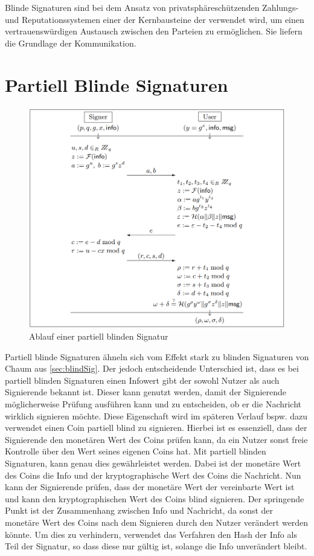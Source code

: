\documentclass[11pt,a4paper]{scrreprt}
\begin{document}
Blinde Signaturen sind bei dem Ansatz von privatsphäreschützenden Zahlungs- und Reputationssystemen einer der Kernbausteine der verwendet wird, um einen vertrauenswürdigen Austausch zwischen den Parteien zu ermöglichen. Sie liefern die Grundlage der Kommunikation.

\section{Partiell Blinde Signaturen}
\label{sec:partBlindSig}
\begin{figure}[h]
    \label{fig:partBlindSig}
    \centering
    \includegraphics*[width=1\textwidth]{partBlindSig.png}
    \caption{Ablauf einer partiell blinden Signatur \cite{abe2000provably}}
\end{figure}
Partiell blinde Signaturen ähneln sich vom Effekt stark zu blinden Signaturen von Chaum aus \ref{sec:blindSig}. Der jedoch entscheidende Unterschied ist, dass es bei partiell blinden Signaturen einen Infowert gibt der sowohl Nutzer als auch Signierende bekannt ist. Dieser kann genutzt werden, damit der Signierende möglicherweise Prüfung ausführen kann und zu entscheiden, ob er die Nachricht wirklich signieren möchte. Diese Eigenschaft wird im späteren Verlauf bspw. dazu verwendet einen Coin partiell blind zu signieren. Hierbei ist es essenziell, dass der Signierende den monetären Wert des Coins prüfen kann, da ein Nutzer sonst freie Kontrolle über den Wert seines eigenen Coins hat. Mit partiell blinden Signaturen, kann genau dies gewährleistet werden. Dabei ist der monetäre Wert des Coins die Info und der kryptographische Wert des Coins die Nachricht. Nun kann der Signierende prüfen, dass der monetäre Wert der vereinbarte Wert ist und kann den kryptographischen Wert des Coins blind signieren. Der springende Punkt ist der Zusammenhang zwischen Info und Nachricht, da sonst der monetäre Wert des Coins nach dem Signieren durch den Nutzer verändert werden könnte. Um dies zu verhindern, verwendet das Verfahren den Hash der Info als Teil der Signatur, so dass diese nur gültig ist, solange die Info unverändert bleibt.
\end{document}
